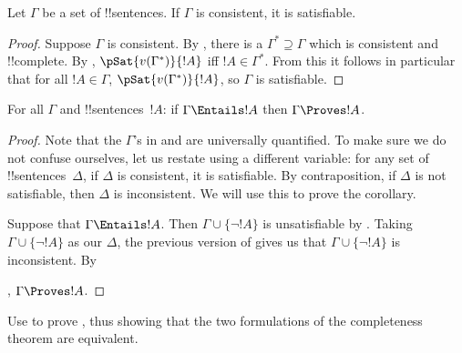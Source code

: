 \begin{thm}
Let $\Gamma$ be a set of !!{sentence}s.  If $\Gamma$ is consistent, it
is satisfiable.
\end{thm}

\begin{proof}
Suppose $\Gamma$ is consistent. By , there
is a $\Gamma^* \supseteq \Gamma$ which is
consistent and !!{complete}.
By
,
$\pSat{v(\Gamma^*)}{!A}$ iff $!A \in
\Gamma^*$.  From this it follows in particular that for all $!A \in
\Gamma$, $\pSat{v(\Gamma^*)}{!A}$, so
$\Gamma$ is satisfiable.
\end{proof}

\begin{cor}
For all $\Gamma$ and !!{sentence}s~$!A$: if $\Gamma \Entails !A$ then
$\Gamma \Proves !A$.
\end{cor}

\begin{proof}
Note that the $\Gamma$'s in  and
 are universally quantified.  To make sure we
do not confuse ourselves, let us restate 
using a different variable: for any set of !!{sentence}s~$\Delta$, if
$\Delta$ is consistent, it is satisfiable.  By contraposition, if
$\Delta$ is not satisfiable, then $\Delta$ is inconsistent.  We will
use this to prove the corollary.

Suppose that $\Gamma \Entails !A$.  Then $\Gamma \cup \{\lnot !A\}$ is
unsatisfiable by .  Taking $\Gamma
\cup \{\lnot !A\}$ as our $\Delta$, the previous version of
 gives us that $\Gamma \cup \{\lnot !A\}$ is
inconsistent.  By

  ,
$\Gamma \Proves !A$.
\end{proof}




\begin{prob}
Use  to prove
, thus showing that the two
formulations of the completeness theorem are equivalent.
\end{prob}





